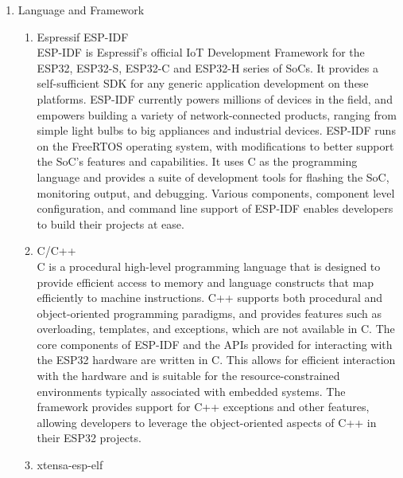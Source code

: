 \documentclass[conference]{IEEEtran}
\begin{document}
\begin{enumerate}[label=\arabic*.]
\item Language and Framework\\
\begin{enumerate}[label=\alph*.]
\item Espressif ESP-IDF\\
ESP-IDF is Espressif’s official IoT Development Framework for the ESP32, ESP32-S, ESP32-C and ESP32-H series of SoCs. It provides a self-sufficient SDK for any generic application development on these platforms. ESP-IDF currently powers millions of devices in the field, and empowers building a variety of network-connected products, ranging from simple light bulbs to big appliances and industrial devices. ESP-IDF runs on the FreeRTOS operating system, with modifications to better support the SoC's features and capabilities. It uses C as the programming language and provides a suite of development tools for flashing the SoC, monitoring output, and debugging. Various components, component level configuration, and command line support of ESP-IDF enables developers to build their projects at ease.\\
\item C/C++\\
C is a procedural high-level programming language that is designed to provide efficient access to memory and language constructs that map efficiently to machine instructions. C++ supports both procedural and object-oriented programming paradigms, and provides features such as overloading, templates, and exceptions, which are not available in C. The core components of ESP-IDF and the APIs provided for interacting with the ESP32 hardware are written in C. This allows for efficient interaction with the hardware and is suitable for the resource-constrained environments typically associated with embedded systems. The framework provides support for C++ exceptions and other features, allowing developers to leverage the object-oriented aspects of C++ in their ESP32 projects.\\
\item xtensa-esp-elf\\

\end{enumerate}
\end{enumerate}
\end{document}
